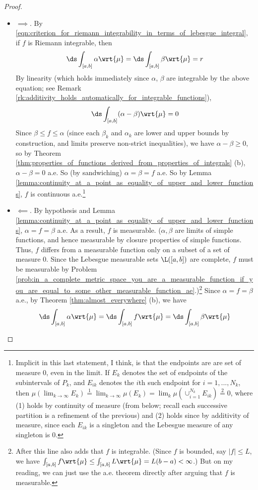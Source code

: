 \documentclass{article} %
\newcommand{\dmu}{\wrt{\mu}}
\begin{document}
\begin{proof}
\begin{alphabate}
\item
\begin{itemize}
\item $\boxed{\implies}$.  By \eqref{eqn:criterion_for_riemann_integrability_in_terms_of_lebesgue_integral}, if $f$ is Riemann integrable, then 
\[ \ds\int_{[a,b]} \alpha \dmu = \ds\int_{[a,b]} \beta \dmu = r\]
By linearity {\tiny (which holds immediately since $\alpha$, $\beta$ are integrable by the above equation; see Remark \ref{rk:additivity_holds_automatically_for_integrable_functions})}, 
\[  \ds\int_{[a,b]} (\alpha-\beta) \dmu =0  \]
Since $\beta \leq f \leq \alpha$ {\tiny (since each $\beta_k$ and $\alpha_k$ are lower and upper bounds by construction, and limits preserve non-strict inequalities)}, we have $\alpha-\beta \geq 0$, so by Theorem \ref{thm:properties_of_functions_derived_from_properties_of_integrals} (b), $\alpha-\beta =0$ a.e.  So {\tiny (by sandwiching)} $\alpha=\beta=f$ a.e.   So by Lemma \ref{lemma:continuity_at_a_point_as_equality_of_upper_and_lower_functions}, $f$ is continuous a.e.\footnote{Implicit in this last statement, I think, is that the endpoints are are set of measure 0, even in the limit.  If $E_k$ denotes the set of endpoints of the subintervals of $P_k$, and $E_{ik}$ denotes the $i$th such endpoint for $i=1,...,N_k$, then $\mu(\lim_{k \to \infty} E_k) \stackrel{1}{=} \lim_{k \to \infty} \mu(E_k) = \lim_k \mu(\cup_{i=1}^{N_k} E_{ik}) \stackrel{2}{=} 0$, where (1) holds by continuity of measure (from below; recall each successive partition is a refinement of the previous) and (2) holds since by additivity of measure, since each $E_{ik}$ is a singleton and the Lebesgue measure of any singleton is 0.
}
\item $\boxed{\impliedby}$.  By hypothesis and Lemma  \ref{lemma:continuity_at_a_point_as_equality_of_upper_and_lower_functions}, $\alpha = f = \beta$ a.e.   As a result, $f$ is measurable.   {\tiny ($\alpha, \beta$ are limits of simple functions, and hence measurable by closure properties of simple functions.  Thus, $f$ differs from a measurable function only on a subset of a set of measure 0.   Since the Lebesgue measurable sets $\L([a,b])$ are complete, $f$ must be measurable by Problem \ref{prob:in_a_complete_metric_space_you_are_a_measurable_function_if_you_are_equal_to_some_other_measurable_function_ae}.)}\footnote{After this line \cite{ash2000probability} also adds that $f$ is integrable. {\tiny (Since $f$ is bounded, say $|f| \leq L$, we have $\int_{[a,b]} f \dmu \leq \int_{[a,b]} L \dmu = L (b-a) < \infty $.) } But on my reading, we can just use the a.e. theorem directly after arguing that $f$ is measurable.} Since $\alpha=f=\beta$ a.e., by Theorem \ref{thm:almost_everywhere} (b),  we have
\begin{align}
\ds\int_{[a,b]} \alpha \dmu =  \ds\int_{[a,b]} f \dmu  = \ds\int_{[a,b]} \beta \dmu  
\label{eqn:lebesgue_integral_of_riemann_integral_fucntion_equals_the_lebesgue_integral_of_the_limits_of_the_upper_and_lower_functions}
\end{align}


\end{itemize}
\end{alphabate}
\end{proof}
\end{document}
